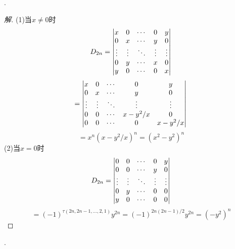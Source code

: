\documentclass[10pt,a4paper]{report}
\begin{document}
.
\begin{proof}[解]
	(1)当$x \neq 0$时\\
	$$D_{2n} = \left|
	\begin{matrix}
	x & 0 & \cdots & 0 & y\\
	0 & x & \cdots & y & 0\\
	\vdots & \vdots & \ddots & \vdots & \vdots\\
	0 & y & \cdots & x & 0 \\
	y & 0 & \cdots & 0 & x 
	\end{matrix}
	\right|\\$$
	$$
	=\left|
	\begin{matrix}
	x & 0 & \cdots & 0 & y\\
	0 & x & \cdots & y & 0\\
	\vdots & \vdots & \ddots & \vdots & \vdots\\
	0 & 0 & \cdots & x-y^{2}/x & 0 \\
	0 & 0 & \cdots & 0 & x-y^{2}/x 
	\end{matrix}
	\right|\\
	$$
	$$
	=x^{n}(x-y^{2}/x)^{n} = (x^{2}-y^{2})^{n}
	$$
	(2)当$x = 0$时
	$$D_{2n} = \left|
	\begin{matrix}
	0 & 0 & \cdots & 0 & y\\
	0 & 0 & \cdots & y & 0\\
	\vdots & \vdots & \ddots & \vdots & \vdots\\
	0 & y & \cdots & 0 & 0 \\
	y & 0 & \cdots & 0 & 0 
	\end{matrix}
	\right|\\$$
	$$
	=(-1)^{\tau(2n,2n-1,...,2,1)}y^{2n} = (-1)^{2n(2n-1)/2}y^{2n} = (-y^{2})^{n}
	$$
\end{proof}
.
\end{document}
